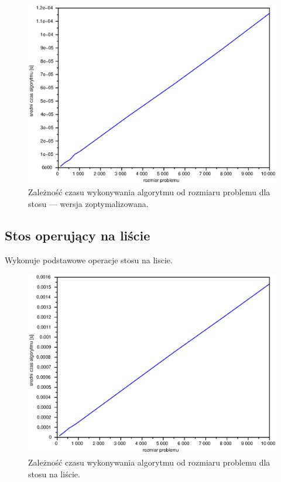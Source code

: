 \documentclass{mwart}
\begin{document}
\begin{figure}[!htp]
\centering
\includegraphics[width=\textwidth]{files/stack2.eps}
\caption{Zależność czasu wykonywania algorytmu od rozmiaru problemu dla stosu --- wersja zoptymalizowana. \label{stack2}} 
\end{figure}

\newpage
\subsection {Stos operujący na liście}
Wykonuje podstawowe operacje stosu na liscie.

\begin{figure}[!htp]
\centering
\includegraphics[width=\textwidth]{files/stonlist.eps}
\caption{Zależność czasu wykonywania algorytmu od rozmiaru problemu dla stosu na liście. \label{stonlist}} 
\end{figure}
\end{document}

